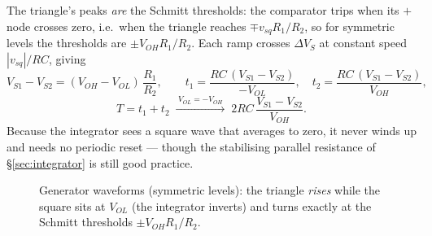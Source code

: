 \documentclass[11pt,a4paper,oneside]{book}
\begin{document}
The triangle's peaks \emph{are} the Schmitt thresholds: the comparator trips
when its $+$ node crosses zero, i.e.\ when the triangle reaches
$\mp v_{sq}R_1/R_2$, so for symmetric levels the thresholds are
$\pm V_{OH}R_1/R_2$. Each ramp crosses $\Delta V_S$ at constant speed
$|v_{sq}|/RC$, giving
\[
  V_{S1}-V_{S2}=(V_{OH}-V_{OL})\,\frac{R_1}{R_2},\qquad
  t_1=\frac{RC\,(V_{S1}-V_{S2})}{-V_{OL}},\quad
  t_2=\frac{RC\,(V_{S1}-V_{S2})}{V_{OH}},
\]
\[
  T=t_1+t_2\;\xrightarrow{\;V_{OL}=-V_{OH}\;}\;2RC\,\frac{V_{S1}-V_{S2}}{V_{OH}}.
\]
Because the integrator sees a square wave that averages to zero, it never
winds up and needs no periodic reset --- though the stabilising parallel
resistance of \S\ref{sec:integrator} is still good practice.

\begin{figure}[h]\centering
{}
\caption{Generator waveforms (symmetric levels): the triangle \emph{rises}
while the square sits at $V_{OL}$ (the integrator inverts) and turns exactly
at the Schmitt thresholds $\pm V_{OH}R_1/R_2$.}
\label{fig:trisqwave}
\end{figure}
\end{document}
